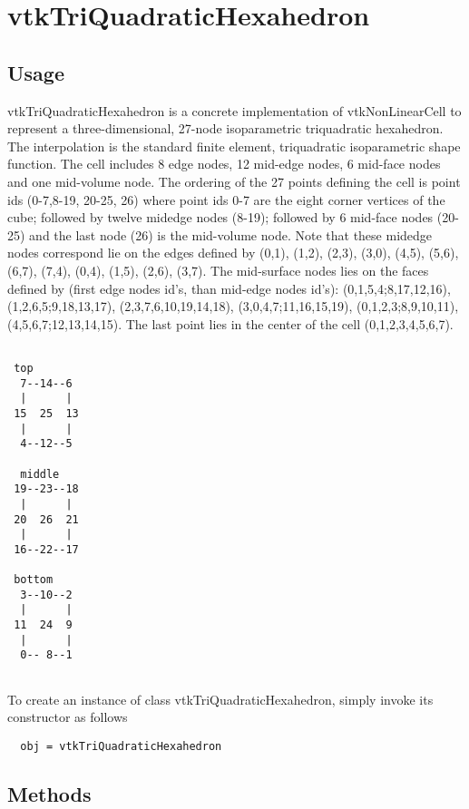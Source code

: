 \section{vtkTriQuadraticHexahedron}

\subsection{Usage}

 vtkTriQuadraticHexahedron is a concrete implementation of vtkNonLinearCell to
 represent a three-dimensional, 27-node isoparametric triquadratic
 hexahedron. The interpolation is the standard finite element, triquadratic
 isoparametric shape function. The cell includes 8 edge nodes, 12 mid-edge nodes, 
 6 mid-face nodes and one mid-volume node. The ordering of the 27 points defining the 
 cell is point ids (0-7,8-19, 20-25, 26)
 where point ids 0-7 are the eight corner vertices of the cube; followed by
 twelve midedge nodes (8-19); followed by 6 mid-face nodes (20-25) and the last node (26) 
 is the mid-volume node. Note that these midedge nodes correspond lie
 on the edges defined by (0,1), (1,2), (2,3), (3,0), (4,5), (5,6), (6,7),
 (7,4), (0,4), (1,5), (2,6), (3,7). The mid-surface nodes lies on the faces
 defined by (first edge nodes id's, than mid-edge nodes id's):
 (0,1,5,4;8,17,12,16), (1,2,6,5;9,18,13,17), (2,3,7,6,10,19,14,18),
 (3,0,4,7;11,16,15,19), (0,1,2,3;8,9,10,11), (4,5,6,7;12,13,14,15).
 The last point lies in the center of the cell (0,1,2,3,4,5,6,7).

 \begin{verbatim}

 top 
  7--14--6
  |      |
 15  25  13
  |      |
  4--12--5

  middle
 19--23--18
  |      |
 20  26  21
  |      |
 16--22--17

 bottom
  3--10--2
  |      |
 11  24  9 
  |      |
  0-- 8--1
  
 \end{verbatim}


To create an instance of class vtkTriQuadraticHexahedron, simply
invoke its constructor as follows
\begin{verbatim}
  obj = vtkTriQuadraticHexahedron
\end{verbatim}
\subsection{Methods}

